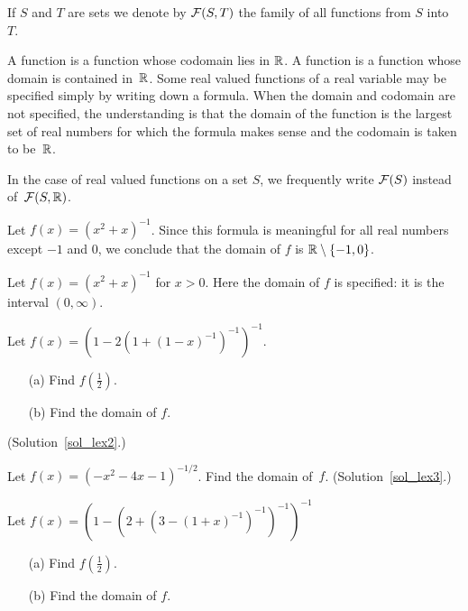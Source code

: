 \begin{notn} If $S$ and $T$ are sets we denote
by $\mathcal{F}(S,T)$ the family of all functions from $S$ into~$T$.
\end{notn}

\begin{conv} A
 function is a function whose codomain lies in
$\mathbb{R}$. A function
 is a function whose domain is contained in~$\mathbb{R}$.  Some real valued
functions of a real variable may be specified simply by writing down a formula.  When the
domain and codomain are not specified, the understanding is that the domain of the function is
the largest set of real numbers for which the formula makes sense and the codomain is taken to
be~$\mathbb{R}$.

In the case of real valued functions on a set $S$, we frequently
write $\mathcal{F}(S)$ instead of~$\mathcal{F}(S,\mathbb{R})$.
\end{conv}

\begin{exam} Let $f(x) = (x^2 + x)^{-1}$. Since this formula is meaningful for all real numbers
except $-1$ and $0$, we conclude that the domain of $f$ is $\mathbb{R} \setminus \{-1,0\}$.
\end{exam}

\begin{exam} Let $f(x) = (x^2 + x)^{-1}$ for $x > 0$. Here the domain of $f$ is specified: it is
the interval $(0,\infty)$.
\end{exam}

\begin{exer}\label{lex2} Let $f(x)=(1- 2(1+(1-x)^{-1})^{-1})^{-1}$.
 \begin{enumerate}
  \item[(a)] Find $f(\frac12)$.
  \item[(b)] Find the domain of $f$.
 \end{enumerate}
(Solution~\ref{sol_lex2}.)
\end{exer}

\begin{exer}\label{lex3} Let $f(x) = (-x^2 - 4x -1)^{-1/2}$. Find the domain of~$f$.
(Solution~\ref{sol_lex3}.) \end{exer}

\begin{prob} Let $f(x)=(1-(2+(3-(1+x)^{-1})^{-1})^{-1})^{-1}$
 \begin{enumerate}
  \item[(a)] Find $f(\frac12)$.
  \item[(b)] Find the domain of $f$.
 \end{enumerate}
\end{prob}

